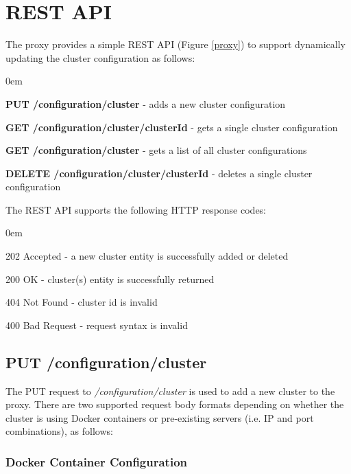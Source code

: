 \documentclass[a4paper,11pt,twoside]{report}
\begin{document}
\section{REST API}\label{REST-API}
The proxy provides a simple REST API (Figure \ref{proxy}) to support dynamically updating the cluster configuration as follows:

\begin{list}{-}{}
  \itemsep0em
  \item\textbf{{PUT /configuration/cluster}} - adds a new cluster configuration
  
  \item\textbf{{GET /configuration/cluster/{clusterId}}} -  gets a single cluster configuration
  
   \item\textbf{{GET /configuration/cluster}} - gets a list of all cluster configurations
   
   \item\textbf{{DELETE /configuration/cluster/{clusterId}}} -  deletes a single cluster configuration
  
\end{list}
\noindent
The REST API supports the following HTTP response codes:

\begin{list}{-}{}
  \itemsep0em
  \item{202 Accepted}  -  a new cluster entity is successfully added or deleted
  
  \item{200 OK} -  cluster(s) entity is successfully returned
  
   \item{404 Not Found} - cluster id is invalid
   
    \item{400 Bad Request } - request syntax is invalid
  
\end{list}

\subsection{PUT /configuration/cluster}\label{PUT}
The PUT request to \textit{/configuration/cluster}  is used to add a new cluster to the proxy. There are two supported request body formats depending on whether the cluster is using Docker containers or pre-existing servers (i.e. IP and port combinations), as follows:\bigskip

\subsubsection*{Docker Container Configuration}
\end{document}
